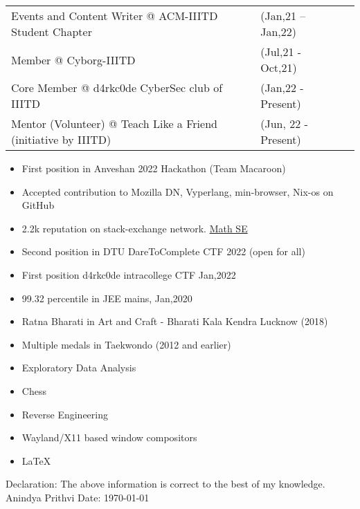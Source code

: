 \documentclass[10pt]{extarticle}
\newcommand{\yourname}{Anindya Prithvi}%
\begin{document}
\endminipage\hfill
\vspace{0pt}
\noindent \minipage{\textwidth}%
\begin{longtable}{p{}p{}p{}}
    Events and Content Writer @ ACM-IIITD Student Chapter & (Jan,21 – Jan,22)\\
    Member @ Cyborg-IIITD & (Jul,21 - Oct,21)\\
    Core Member @ d4rkc0de CyberSec club of IIITD & (Jan,22 - Present)\\
    Mentor (Volunteer) @ Teach Like a Friend (initiative by IIITD) & (Jun, 22 - Present)\\
\end{longtable}
\vspace{0pt}
\endminipage\hfill
\noindent\minipage{\textwidth}%
\vspace{0pt}
\begin{itemize}
    \setlength\itemsep{0.5pt}
    \item First position in Anveshan 2022 Hackathon (Team Macaroon)
    \item Accepted contribution to Mozilla DN, Vyperlang, min-browser, Nix-os on GitHub
    \item 2.2k reputation on stack-exchange network. \href{https://math.stackexchange.com/users/811225}{\color{red!70} Math SE}
    \item Second position in DTU DareToComplete CTF 2022 (open for all)
    \item First position d4rkc0de intracollege CTF Jan,2022
    \item 99.32 percentile in JEE mains, Jan,2020
    \item Ratna Bharati in Art and Craft - Bharati Kala Kendra Lucknow (2018)
    \item Multiple medals in Taekwondo (2012 and earlier)
\end{itemize}
\vspace{0pt}
\endminipage\hfill
{}
\minipage{\textwidth}%
\vspace{12pt}
\begin{itemize}
    \setlength\itemsep{0.5pt}
    \item Exploratory Data Analysis
    \item Chess
    \item Reverse Engineering
    \item Wayland/X11 based window compositors
    \item \LaTeX
\end{itemize}
\vspace{5pt}
\endminipage\hfill
Declaration: The above information is correct to the best of my knowledge.\newline
\yourname\newline
Date: \today
\end{document}
